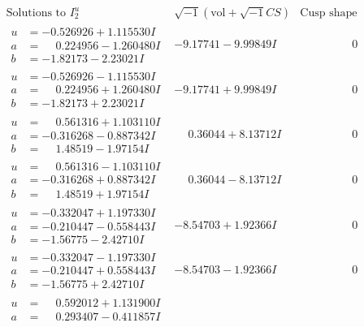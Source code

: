 \documentclass[1p]{elsarticle_modified}
\theoremstyle{definition}
\newcommand{\I}{\sqrt{-1}}
\begin{document}
$$\begin{array}{c|c|c}
\text{Solutions to }I^u_{2}& \I (\text{vol} + \sqrt{-1}CS) & \text{Cusp shape}\\
 \hline 
\begin{aligned}
u &= -0.526926 + 1.115530 I \\
a &= \phantom{-}0.224956 - 1.260480 I \\
b &= -1.82173 - 2.23021 I\end{aligned}
 & -9.17741 - 9.99849 I & \phantom{-0.000000 } 0 \\ \hline\begin{aligned}
u &= -0.526926 - 1.115530 I \\
a &= \phantom{-}0.224956 + 1.260480 I \\
b &= -1.82173 + 2.23021 I\end{aligned}
 & -9.17741 + 9.99849 I & \phantom{-0.000000 } 0 \\ \hline\begin{aligned}
u &= \phantom{-}0.561316 + 1.103110 I \\
a &= -0.316268 - 0.887342 I \\
b &= \phantom{-}1.48519 - 1.97154 I\end{aligned}
 & \phantom{-}0.36044 + 8.13712 I & \phantom{-0.000000 } 0 \\ \hline\begin{aligned}
u &= \phantom{-}0.561316 - 1.103110 I \\
a &= -0.316268 + 0.887342 I \\
b &= \phantom{-}1.48519 + 1.97154 I\end{aligned}
 & \phantom{-}0.36044 - 8.13712 I & \phantom{-0.000000 } 0 \\ \hline\begin{aligned}
u &= -0.332047 + 1.197330 I \\
a &= -0.210447 - 0.558443 I \\
b &= -1.56775 - 2.42710 I\end{aligned}
 & -8.54703 + 1.92366 I & \phantom{-0.000000 } 0 \\ \hline\begin{aligned}
u &= -0.332047 - 1.197330 I \\
a &= -0.210447 + 0.558443 I \\
b &= -1.56775 + 2.42710 I\end{aligned}
 & -8.54703 - 1.92366 I & \phantom{-0.000000 } 0 \\ \hline\begin{aligned}
u &= \phantom{-}0.592012 + 1.131900 I \\
a &= \phantom{-}0.293407 - 0.411857 I \\

\end{aligned}
\end{array}$$
\end{document}
